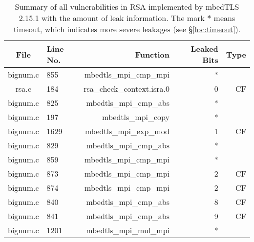 \begin{table}%
\centering\tiny\scriptsize
\caption{Summary of all vulnerabilities in RSA implemented by mbedTLS 2.15.1 with the amount of leak information. The mark $*$ means timeout, which indicates more severe leakages (see \S\ref{loc:timeout}).}\label{tab:RSAmbedTLS}
\begin{tabular}{clrrr}
\hline
\textbf{File} & \textbf{Line No.} & \textbf{Function} & \textbf{Leaked Bits} & \textbf{Type} \\\hline
bignum.c& 855&mbedtls\_mpi\_cmp\_mpi&*&\\
rsa.c& 184&rsa\_check\_context.isra.0&0 &CF\\
bignum.c& 825&mbedtls\_mpi\_cmp\_abs&*&\\
bignum.c& 197&mbedtls\_mpi\_copy&*&\\
bignum.c& 1629&mbedtls\_mpi\_exp\_mod&1 &CF\\
bignum.c& 829&mbedtls\_mpi\_cmp\_abs&*&\\
bignum.c& 859&mbedtls\_mpi\_cmp\_mpi&*&\\
bignum.c& 873&mbedtls\_mpi\_cmp\_mpi&2 &CF\\
bignum.c& 874&mbedtls\_mpi\_cmp\_mpi&2 &CF\\
bignum.c& 840&mbedtls\_mpi\_cmp\_abs&8 &CF\\
bignum.c& 841&mbedtls\_mpi\_cmp\_abs&9 &CF\\
bignum.c& 1201&mbedtls\_mpi\_mul\_mpi&*&\\
\hline
\end{tabular}
\end{table}